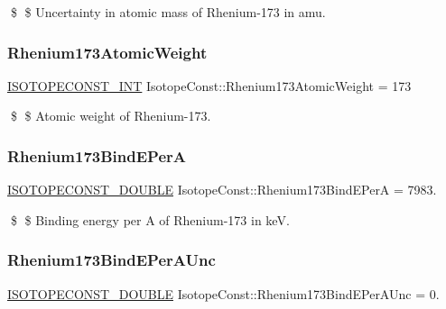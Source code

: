 \$ \$ Uncertainty in atomic mass of Rhenium-\/173 in amu. \mbox{\label{group___isotope_const-_rhenium-_re173_gaf47c1ed342eebaeca15d04a4fb8942b6}} 
\subsubsection{\texorpdfstring{Rhenium173\+Atomic\+Weight}{Rhenium173AtomicWeight}}
{\footnotesize\ttfamily \mbox{\hyperlink{group___isotope_const-_macros_ga5f18360b3e99483a35c32d789e62621c}{I\+S\+O\+T\+O\+P\+E\+C\+O\+N\+S\+T\+\_\+\+I\+NT}} Isotope\+Const\+::\+Rhenium173\+Atomic\+Weight = 173}

\$ \$ Atomic weight of Rhenium-\/173. \mbox{\label{group___isotope_const-_rhenium-_re173_ga75d7f5599785e8ade6cba9e833302698}} 
\subsubsection{\texorpdfstring{Rhenium173\+Bind\+E\+PerA}{Rhenium173BindEPerA}}
{\footnotesize\ttfamily \mbox{\hyperlink{group___isotope_const-_macros_ga8f45a7272ce02c0b4c65c44636ed719a}{I\+S\+O\+T\+O\+P\+E\+C\+O\+N\+S\+T\+\_\+\+D\+O\+U\+B\+LE}} Isotope\+Const\+::\+Rhenium173\+Bind\+E\+PerA = 7983.}

\$ \$ Binding energy per A of Rhenium-\/173 in keV. \mbox{\label{group___isotope_const-_rhenium-_re173_ga05bd5e27c1d38e5797ad18585bad27a3}} 
\subsubsection{\texorpdfstring{Rhenium173\+Bind\+E\+Per\+A\+Unc}{Rhenium173BindEPerAUnc}}
{\footnotesize\ttfamily \mbox{\hyperlink{group___isotope_const-_macros_ga8f45a7272ce02c0b4c65c44636ed719a}{I\+S\+O\+T\+O\+P\+E\+C\+O\+N\+S\+T\+\_\+\+D\+O\+U\+B\+LE}} Isotope\+Const\+::\+Rhenium173\+Bind\+E\+Per\+A\+Unc = 0.}

